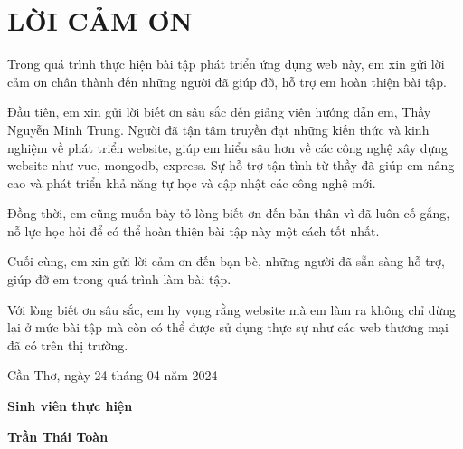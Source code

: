 \section*{LỜI CẢM ƠN}
Trong quá trình thực hiện bài tập phát triển ứng dụng web này, em xin gửi lời cảm ơn chân thành đến những người đã giúp đỡ, hỗ trợ em hoàn thiện bài tập. \par
Đầu tiên, em xin gửi lời biết ơn sâu sắc đến giảng viên hướng dẫn em, Thầy Nguyễn Minh Trung. Người đã tận tâm truyền đạt những kiến thức và kinh nghiệm về phát triển website, giúp em hiểu sâu hơn về các công nghệ xây dựng website như vue, mongodb, express. Sự hỗ trợ tận tình từ thầy đã giúp em nâng cao và phát triển khả năng tự học và cập nhật các công nghệ mới. \par
Đồng thời, em cũng muốn bày tỏ lòng biết ơn đến bản thân vì đã luôn cố gắng, nỗ lực học hỏi để có thể hoàn thiện bài tập này một cách tốt nhất. \par
Cuối cùng, em xin gửi lời cảm ơn đến bạn bè, những người đã sẵn sàng hỗ trợ, giúp đỡ em trong quá trình làm bài tập. \par
Với lòng biết ơn sâu sắc, em hy vọng rằng website mà em làm ra không chỉ dừng lại ở mức bài tập mà còn có thể được sử dụng thực sự như các web thương mại đã có trên thị trường.

\vspace{6pt}
\hspace{7cm}Cần Thơ, ngày 24 tháng 04 năm 2024

\hspace{9cm}\textbf{Sinh viên thực hiện}

\vspace{2cm}
\hspace{9.25cm}\textbf{Trần Thái Toàn}
\thispagestyle{empty}
\newpage
